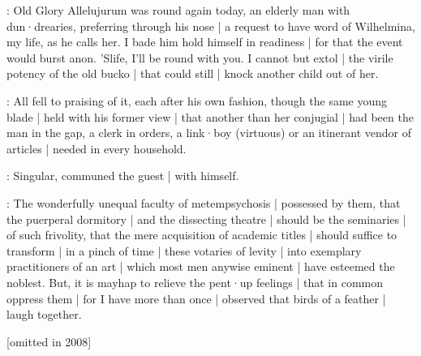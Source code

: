 \crotthers:
Old Glory Allelujurum was round again today,
an elderly man with dun·drearies,
preferring through his nose |
a request to have word of Wilhelmina,
my life,
as he calls her.
I bade him hold himself in readiness |
for that the event would burst anon.
'Slife,
I'll be round with you.
I cannot but extol |
the virile potency of the old bucko |
that could still |
knock another child out of her.

:
All fell to praising of it,
each after his own fashion,
though the same young blade |
held with his former view |
that another than her conjugial |
had been the man in the gap,
a clerk in orders,
a link·boy
(virtuous)
or an itinerant vendor of articles |
needed in every household.

:
Singular,
communed the guest |
with himself.

\Bloom:
The wonderfully unequal faculty of metempsychosis |
possessed by them,
that the puerperal dormitory |
and the dissecting theatre |
should be the seminaries |
of such frivolity,
that the mere acquisition of academic titles |
should suffice to transform |
in a pinch of time |
these votaries of levity |
into exemplary practitioners of an art |
which most men anywise eminent |
have esteemed the noblest.
But,
it is mayhap to relieve the pent·up feelings |
that in common oppress them |
for I have more than once |
observed that birds of a feather |
laugh together.


[omitted in 2008]


